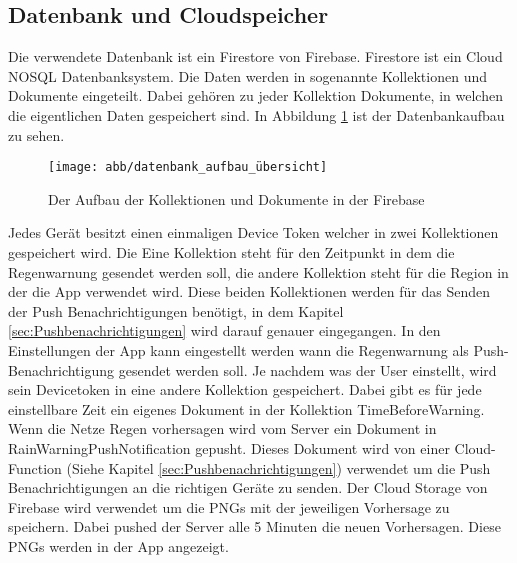 \subsection{Datenbank und Cloudspeicher}\label{datenbank und cloudspeicher}
Die verwendete Datenbank ist ein Firestore von Firebase. Firestore ist ein Cloud NOSQL Datenbanksystem. 
Die Daten werden in sogenannte Kollektionen und Dokumente eingeteilt. 
Dabei gehören zu jeder Kollektion Dokumente, in welchen die eigentlichen Daten gespeichert sind. 
In Abbildung \ref{fig:datenbank_aufbau} ist der Datenbankaufbau zu sehen.
\begin{figure}[h]
 \centering
 \texttt{[image: abb/datenbank\_aufbau\_übersicht]}
 \caption[Datenbankarchitektur]{Der Aufbau der Kollektionen und Dokumente in der Firebase}
\label{fig:datenbank_aufbau}
\end{figure}

Jedes Gerät besitzt einen einmaligen Device Token welcher in zwei Kollektionen gespeichert wird. 
Die Eine Kollektion steht für den Zeitpunkt in dem die Regenwarnung gesendet werden soll, die andere Kollektion steht für die Region in der die App verwendet wird. 
Diese beiden Kollektionen werden für das Senden der Push Benachrichtigungen benötigt, in dem Kapitel \ref{sec:Pushbenachrichtigungen} wird darauf genauer eingegangen. 
In den Einstellungen der App kann eingestellt werden wann die Regenwarnung als Push-Benachrichtigung gesendet werden soll.
Je nachdem was der User einstellt, wird sein Devicetoken in eine andere Kollektion gespeichert. 
Dabei gibt es für jede einstellbare Zeit ein eigenes Dokument in der Kollektion TimeBeforeWarning. 
Wenn die Netze Regen vorhersagen wird vom Server ein Dokument in RainWarningPushNotification gepusht. 
Dieses Dokument wird von einer Cloud-Function (Siehe Kapitel \ref{sec:Pushbenachrichtigungen}) verwendet um die Push Benachrichtigungen an die richtigen Geräte zu senden.
Der Cloud Storage von Firebase wird verwendet um die PNGs mit der jeweiligen Vorhersage zu speichern.
Dabei pushed der Server alle 5 Minuten die neuen Vorhersagen. Diese PNGs werden in der App angezeigt. 